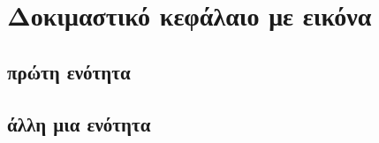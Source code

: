 \chapter{\texorpdfstring{Δοκιμαστικό κεφάλαιο με εικόνα }{Δοκιμαστικό κεφάλαιο με svg}}
\section{πρώτη ενότητα}
\en{\lipsum[1-2]}
\section{άλλη μια ενότητα}
\en{\lipsum[3-4]}
